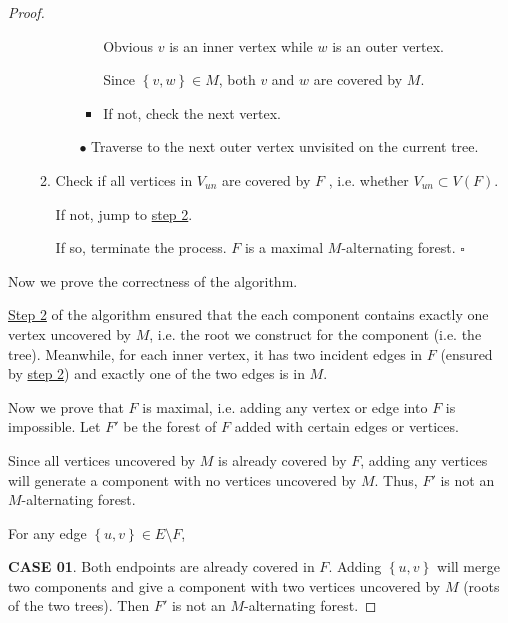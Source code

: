 \documentclass{article}
\newcommand{\whiteqed}{\hfill $\square$\par}
\newcommand{\set}[1]{\left\{#1\right\}}
\begin{document}
\begin{proof}
\begin{itemize}
\begin{enumerate}
\begin{itemize}
\begin{itemize}
                Obvious $v$ is an inner vertex while $w$ is an outer vertex.
                
                Since $\set{v,w}\in M$, both $v$ and $w$ are covered by $M$.
                \item If not, check the next vertex.
            \end{itemize}
            
            \item[$\bullet$] Traverse to the next outer vertex unvisited on the current tree.
        \end{itemize}
        
        \item Check if all vertices in $V_{un}$ are covered by $F$ , i.e. whether $V_{un}\subset V(F)$. 
        
        If not, jump to \underline{step 2}.
        
        If so, terminate the process. $F$ is a maximal $M$-alternating forest. \whiteqed
        \end{enumerate}
    \end{itemize}
    
    \vspace{0.5em} \hspace{1.3em}
    Now we prove the correctness of the algorithm.
    
    \hspace{1.3em}
    \underline{Step 2} of the algorithm ensured that the each component contains exactly one vertex uncovered by $M$, i.e. the root we construct for the component (i.e. the tree). Meanwhile, for each inner vertex, it has two incident edges in $F$ (ensured by \underline{step 2}) and exactly one of the two edges is in $M$.
    
    \hspace{1.3em}
    Now we prove that $F$ is maximal, i.e. adding any vertex or edge into $F$ is impossible. Let $F'$ be the forest of $F$ added with certain edges or vertices.
    
    \hspace{1.3em}
    Since all vertices uncovered by $M$ is already covered by $F$, adding any vertices will generate a component with no vertices uncovered by $M$. Thus, $F'$ is not an $M$-alternating forest.
    
    \hspace{1.3em}
    For any edge $\set{u,v}\in E\setminus F$,
    
    \hspace{1.3em}
    \textbf{CASE 01}. Both endpoints are already covered in $F$. Adding $\set{u,v}$ will merge two components and give a component with two vertices uncovered by $M$ (roots of the two trees). Then $F'$ is not an $M$-alternating forest.
    

\end{proof}
\end{document}
